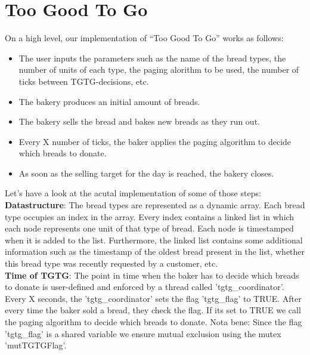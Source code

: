 \documentclass[11pt]{article}
\begin{document}
\section{Too Good To Go}
\label{sec:orgd72a299}

On a high level, our implementation of ``Too Good To Go'' works as follows:\\
\begin{itemize}
\item The user inputs the parameters such as the name of the bread types, the number of units of each type, the paging alorithm to be used, the number of ticks between TGTG-decisions, etc.\\
\item The bakery produces an initial amount of breads.\\
\item The bakery sells the bread and bakes new breads as they run out.\\
\item Every X number of ticks, the baker applies the paging algorithm to decide which breads to donate.\\
\item As soon as the selling target for the day is reached, the bakery closes.\\
\end{itemize}

Let's have a look at the acutal implementation of some of those steps:\\

\textbf{Datastructure}: The bread types are represented as a dynamic array. Each bread type occupies an index in the array. Every index contains a linked list in which each node represents one unit of that type of bread. Each node is timestamped when it is added to the list. Furthermore, the linked list contains some additional information such as the timestamp of the oldest bread present in the list, whether this bread type was recently requested by a customer, etc.\\

\textbf{Time of TGTG}: The point in time when the baker has to decide which breads to donate is user-defined and enforced by a thread called 'tgtg\_coordinator'. Every X seconds, the 'tgtg\_coordinator' sets the flag 'tgtg\_flag' to TRUE. After every time the baker sold a bread, they check the flag. If its set to TRUE we call the paging algorithm to decide which breads to donate. Nota bene: Since the flag 'tgtg\_flag' is a shared variable we ensure mutual exclusion using the mutex 'mutTGTGFlag'.\\
\end{document}
